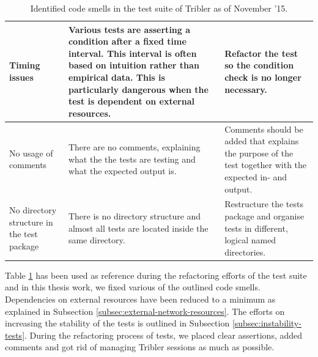 \begin{table}
\begin{tabularx}{\textwidth}{|X|X|X|}
		Timing issues & Various tests are asserting a condition after a fixed time interval. This interval is often based on intuition rather than empirical data. This is particularly dangerous when the test is dependent on external resources. & Refactor the test so the condition check is no longer necessary.\\ \hline
		No usage of comments & There are no comments, explaining what the the tests are testing and what the expected output is. & Comments should be added that explains the purpose of the test together with the expected in- and output. \\ \hline
		No directory structure in the test package & There is no directory structure and almost all tests are located inside the same directory. & Restructure the tests package and organise tests in different, logical named directories.\\ \hline
	\end{tabularx}
	\caption{Identified code smells in the test suite of Tribler as of November '15.}
	\label{table:tests-code-smells}
\end{table}

Table \ref{table:tests-code-smells} has been used as reference during the refactoring efforts of the test suite and in this thesis work, we fixed various of the outlined code smells. Dependencies on external resources have been reduced to a minimum as explained in Subsection \ref{subsec:external-network-resources}. The efforts on increasing the stability of the tests is outlined in Subsection \ref{subsec:instability-tests}. During the refactoring process of tests, we placed clear assertions, added comments and got rid of managing Tribler sessions as much as possible.


